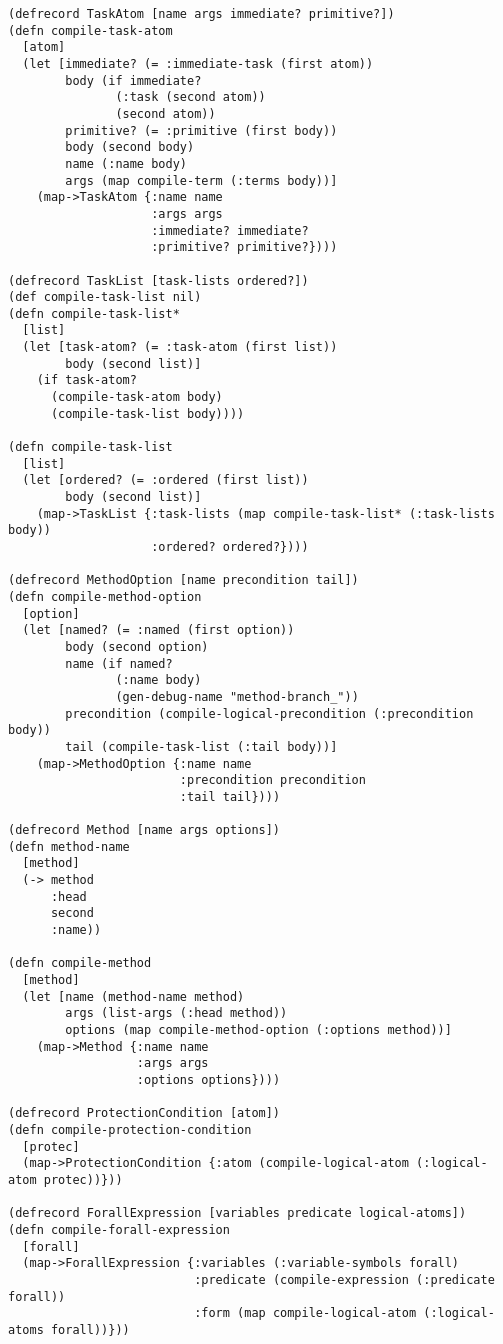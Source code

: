 \begin{lstlisting}
(defrecord TaskAtom [name args immediate? primitive?])
(defn compile-task-atom
  [atom]
  (let [immediate? (= :immediate-task (first atom))
        body (if immediate?
               (:task (second atom))
               (second atom))
        primitive? (= :primitive (first body))
        body (second body)
        name (:name body)
        args (map compile-term (:terms body))]
    (map->TaskAtom {:name name
                    :args args
                    :immediate? immediate?
                    :primitive? primitive?})))

(defrecord TaskList [task-lists ordered?])
(def compile-task-list nil)
(defn compile-task-list*
  [list]
  (let [task-atom? (= :task-atom (first list))
        body (second list)]
    (if task-atom?
      (compile-task-atom body)
      (compile-task-list body))))

(defn compile-task-list
  [list]
  (let [ordered? (= :ordered (first list))
        body (second list)]
    (map->TaskList {:task-lists (map compile-task-list* (:task-lists body))
                    :ordered? ordered?})))

(defrecord MethodOption [name precondition tail])
(defn compile-method-option
  [option]
  (let [named? (= :named (first option))
        body (second option)
        name (if named?
               (:name body)
               (gen-debug-name "method-branch_"))
        precondition (compile-logical-precondition (:precondition body))
        tail (compile-task-list (:tail body))]
    (map->MethodOption {:name name
                        :precondition precondition
                        :tail tail})))

(defrecord Method [name args options])
(defn method-name
  [method]
  (-> method
      :head
      second
      :name))

(defn compile-method
  [method]
  (let [name (method-name method)
        args (list-args (:head method))
        options (map compile-method-option (:options method))]
    (map->Method {:name name
                  :args args
                  :options options})))

(defrecord ProtectionCondition [atom])
(defn compile-protection-condition
  [protec]
  (map->ProtectionCondition {:atom (compile-logical-atom (:logical-atom protec))}))

(defrecord ForallExpression [variables predicate logical-atoms])
(defn compile-forall-expression
  [forall]
  (map->ForallExpression {:variables (:variable-symbols forall)
                          :predicate (compile-expression (:predicate forall))
                          :form (map compile-logical-atom (:logical-atoms forall))}))


\end{lstlisting}
